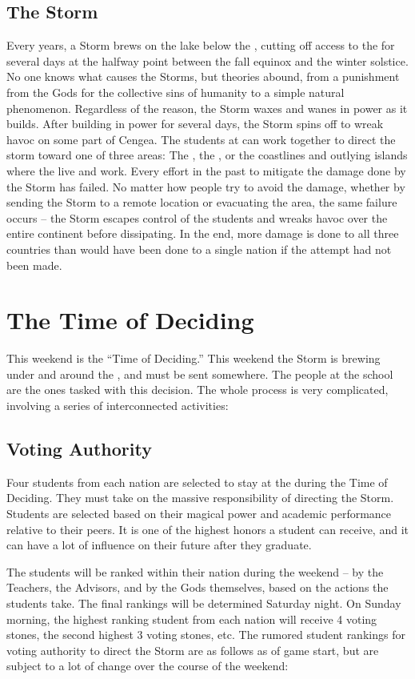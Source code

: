 \documentclass[blue]{GL2020}
\begin{document}
\subsection*{The Storm}
Every \pCycle{} years, a Storm brews on the lake below the \pSc{}, cutting off access to the \pSc{} for several days at the halfway point between the fall equinox and the winter solstice. No one knows what causes the Storms, but theories abound, from a punishment from the Gods for the collective sins of humanity to a simple natural phenomenon. Regardless of the reason, the Storm waxes and wanes in power as it builds. After building in power for several days, the Storm spins off to wreak havoc on some part of Cengea. The students at \pSchool{} can work together to direct the storm toward one of three areas: The \pFarm{}, the \pTech{}, or the coastlines and outlying islands where the \pShippies{} live and work. Every effort in the past to mitigate the damage done by the Storm has failed. No matter how people try to avoid the damage, whether by sending the Storm to a remote location or evacuating the area, the same failure occurs -- the Storm escapes control of the students and wreaks havoc over the entire continent before dissipating. In the end, more damage is done to all three countries than would have been done to a single nation if the attempt had not been made. 

\section*{The Time of Deciding}
This weekend is the ``Time of Deciding.'' This weekend the Storm is brewing under and around the \pSchool{}, and must be sent somewhere. The people at the school are the ones tasked with this decision. The whole process is very complicated, involving a series of interconnected activities:

\subsection*{Voting Authority}
Four students from each nation are selected to stay at the \pSc{} during the Time of Deciding. They must take on the massive responsibility of directing the Storm. Students are selected based on their magical power and academic performance relative to their peers. It is one of the highest honors a student can receive, and it can have a lot of influence on their future after they graduate.

The students will be ranked within their nation during the weekend -- by the Teachers, the Advisors, and by the Gods themselves, based on the actions the students take. The final rankings will be determined Saturday night. On Sunday morning, the highest ranking student from each nation will receive 4 voting stones, the second highest 3 voting stones, etc.
The rumored student rankings for voting authority to direct the Storm are as follows as of game start, but are subject to a lot of change over the course of the weekend:
\end{document}
